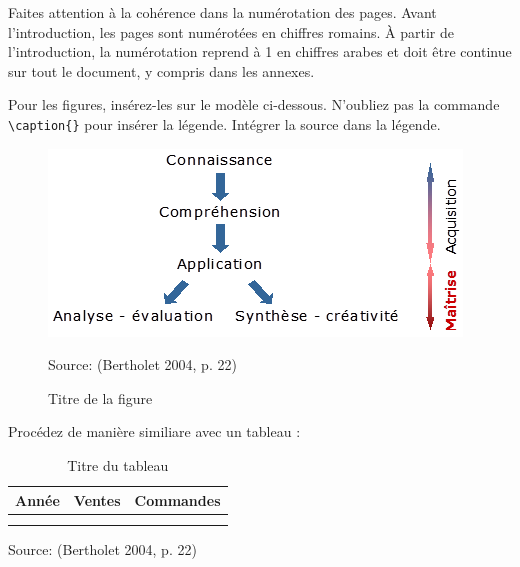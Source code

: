 Faites attention à la cohérence dans la numérotation des pages. Avant l'introduction, les pages sont numérotées en chiffres romains. À partir de l'introduction, la numérotation reprend à 1 en chiffres arabes et doit être continue sur tout le document, y compris dans les annexes.

Pour les figures, insérez-les sur le modèle ci-dessous. N'oubliez pas la commande \verb?\caption{}? pour insérer la légende. Intégrer la source dans la légende.

\begin{figure}[H]
	\noindent \begin{centering}
		\caption{Titre de la figure}
		\bigskip{}
			\includegraphics{images/image3.png}\bigskip{}
	\par \end{centering}
	\noindent \begin{raggedleft}
		Source: (Bertholet 2004, p. 22) %
	\par \end{raggedleft}
\end{figure}

Procédez de manière similiare avec un tableau :

\begin{table}[H]
	\noindent \begin{centering}
	\caption{Titre du tableau}
	\bigskip{}
		\begin{tabular}{|m{}|m{}|m{0.4\textwidth}|}
			\hline
			\textbf{Année} & \textbf{Ventes} & \textbf{Commandes} \\
			\hline
			 &  &  \\
			\hline
			 &  &  \\
			\hline
		\end{tabular}
		\bigskip{}
	\par\end{centering}
	\noindent \begin{raggedleft}
		Source: (Bertholet 2004, p. 22) %
	\par\end{raggedleft}
\end{table}

